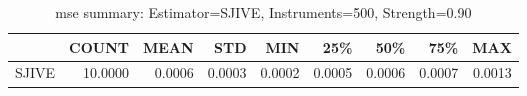 \begin{table}[ht]
\centering
\caption{mse summary: Estimator=SJIVE, Instruments=500, Strength=0.90}
\begin{tabular}{lrrrrrrrr}
\toprule
 & COUNT & MEAN & STD & MIN & 25\% & 50\% & 75\% & MAX \\
\midrule
SJIVE & 10.0000 & 0.0006 & 0.0003 & 0.0002 & 0.0005 & 0.0006 & 0.0007 & 0.0013 \\
\bottomrule
\end{tabular}
\end{table}
